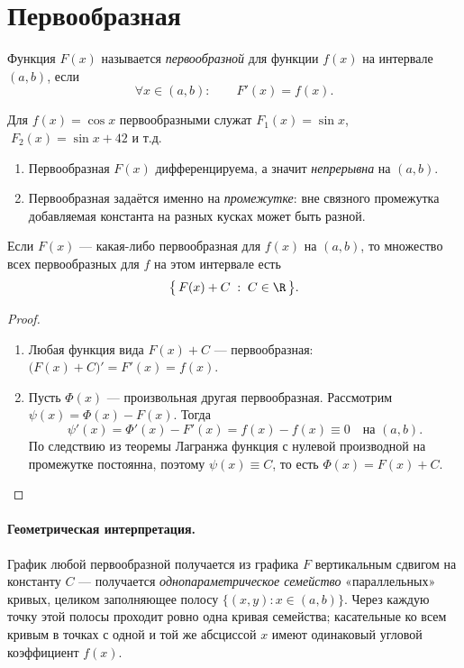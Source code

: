 \section{Первообразная}

\begin{definition}[первообразная]
Функция $F(x)$ называется \emph{первообразной} для функции $f(x)$ на интервале $(a,b)$, если
\[
  \forall x\in(a,b):\qquad F'(x)=f(x).
\]
\end{definition}

\begin{example}
Для $f(x)=\cos x$ первообразными служат $F_1(x)=\sin x$, $\;F_2(x)=\sin x+42$ и т.д.
\end{example}

\begin{remark}\leavevmode
\begin{enumerate}[label=\arabic*),leftmargin=*]
  \item Первообразная $F(x)$ дифференцируема, а значит \emph{непрерывна} на $(a,b)$.
  \item Первообразная задаётся именно на \emph{промежутке}: вне связного промежутка добавляемая
        константа на разных кусках может быть разной.
\end{enumerate}
\end{remark}

\begin{theorem}
Если $F(x)$ --- какая-либо первообразная для $f(x)$ на $(a,b)$, то множество всех первообразных
для $f$ на этом интервале есть
\[
  \bigl\{\,F(x)+C \;:\; C\in\R\,\bigr\}.
\]
\end{theorem}

\begin{proof}\leavevmode
\begin{enumerate}[label=\arabic*),leftmargin=*]
  \item Любая функция вида $F(x)+C$ — первообразная: $\bigl(F(x)+C\bigr)'=F'(x)=f(x)$.
  \item Пусть $\Phi(x)$ — произвольная другая первообразная. Рассмотрим
        $\psi(x)=\Phi(x)-F(x)$. Тогда
        \[
          \psi'(x)=\Phi'(x)-F'(x)=f(x)-f(x)\equiv 0 \quad\text{на }(a,b).
        \]
        По следствию из теоремы Лагранжа функция с нулевой производной на промежутке постоянна,
        поэтому $\psi(x)\equiv C$, то есть $\Phi(x)=F(x)+C$. \qedhere
\end{enumerate}
\end{proof}

\paragraph{Геометрическая интерпретация.}
График любой первообразной получается из графика $F$ вертикальным сдвигом на константу $C$ ---
получается \emph{однопараметрическое семейство} «параллельных» кривых, целиком заполняющее полосу
$\{(x,y):x\in(a,b)\}$. Через каждую точку этой полосы проходит ровно одна кривая семейства;
касательные ко всем кривым в точках с одной и той же абсциссой $x$ имеют одинаковый угловой
коэффициент $f(x)$.

